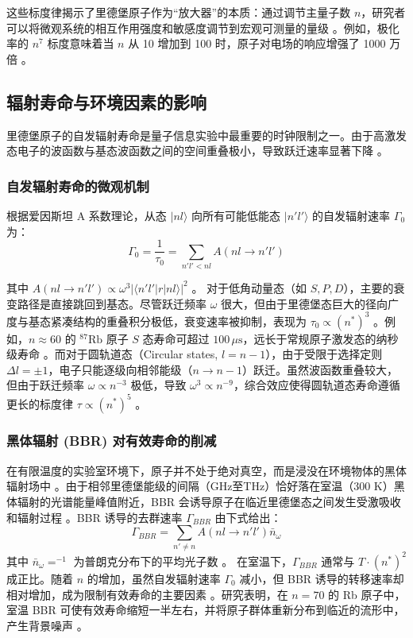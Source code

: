 \documentclass[../main.tex]{subfiles}
\begin{document}
这些标度律揭示了里德堡原子作为“放大器”的本质：通过调节主量子数 $n$，研究者可以将微观系统的相互作用强度和敏感度调节到宏观可测量的量级 。例如，极化率的 $n^7$ 标度意味着当 $n$ 从 10 增加到 100 时，原子对电场的响应增强了 1000 万倍 。

\subsection{辐射寿命与环境因素的影响}

里德堡原子的自发辐射寿命是量子信息实验中最重要的时钟限制之一。由于高激发态电子的波函数与基态波函数之间的空间重叠极小，导致跃迁速率显著下降 。

\subsubsection{自发辐射寿命的微观机制}

根据爱因斯坦 A 系数理论\cite{einstein1916quantentheorie}，从态 $|nl\rangle$ 向所有可能低能态 $|n'l'\rangle$ 的自发辐射速率 $\Gamma_0$ 为：
\begin{equation}
\Gamma_0 = \frac{1}{\tau_0} = \sum_{n'l' < nl} A(nl \to n'l')
\end{equation}

其中 $A(nl \to n'l') \propto \omega^3 |\langle n'l' | r | nl \rangle|^2$ 。
对于低角动量态（如 $S, P, D$），主要的衰变路径是直接跳回到基态。尽管跃迁频率 $\omega$ 很大，但由于里德堡态巨大的径向广度与基态紧凑结构的重叠积分极低，衰变速率被抑制，表现为 $\tau_0 \propto (n^*)^3$ 。例如，$n \approx 60$ 的 $^{87}\text{Rb}$ 原子 $S$ 态寿命可超过 $100 \, \mu\text{s}$，远长于常规原子激发态的纳秒级寿命 。而对于圆轨道态（Circular states, $l = n-1$），由于受限于选择定则 $\Delta l = \pm 1$，电子只能逐级向相邻能级（$n \to n-1$）跃迁。虽然波函数重叠较大，但由于跃迁频率 $\omega \propto n^{-3}$ 极低，导致 $\omega^3 \propto n^{-9}$，综合效应使得圆轨道态寿命遵循更长的标度律 $\tau \propto (n^*)^5$ 。

\subsubsection{黑体辐射 (BBR) 对有效寿命的削减}

在有限温度的实验室环境下，原子并不处于绝对真空，而是浸没在环境物体的黑体辐射场中 。由于相邻里德堡能级的间隔（GHz至THz）恰好落在室温（300 K）黑体辐射的光谱能量峰值附近，BBR 会诱导原子在临近里德堡态之间发生受激吸收和辐射过程 。BBR 诱导的去群速率 $\Gamma_{BBR}$ 由下式给出：
\begin{equation}
\Gamma_{BBR} = \sum_{n' \neq n} A(nl \to n'l') \bar{n}_\omega
\end{equation}
其中 $\bar{n}_\omega =^{-1}$ 为普朗克分布下的平均光子数 。
在室温下，$\Gamma_{BBR}$ 通常与 $T \cdot (n^*)^2$ 成正比。随着 $n$ 的增加，虽然自发辐射速率 $\Gamma_0$ 减小，但 BBR 诱导的转移速率却相对增加，成为限制有效寿命的主要因素 。研究表明，在 $n=70$ 的 Rb 原子中，室温 BBR 可使有效寿命缩短一半左右，并将原子群体重新分布到临近的流形中，产生背景噪声 。
\end{document}
